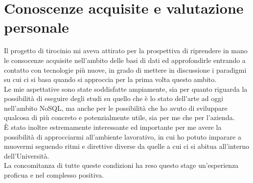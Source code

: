 \section{Conoscenze acquisite e valutazione personale}
Il progetto di tirocinio mi aveva attirato per la prospettiva di riprendere in mano le consocenze acquisite nell'ambito delle basi di dati ed approfondirle entrando a contatto con tecnologie più nuove, in grado di mettere in discussione i paradigmi su cui ci si basa quando si approccia per la prima volta questo ambito.\\

\noindent Le mie aspettative sono state soddisfatte ampiamente, sia per quanto riguarda la possibilità di eseguire degli studi su quello che è lo stato dell'arte ad oggi nell'ambito NoSQL, ma anche per le possibilità che ho avuto di sviluppare qualcosa di più concreto e potenzialmente utile, sia per me che per l'azienda.\\

\noindent È stato inoltre estremamente interessante ed importante per me avere la possibilità di approcciarmi all'ambiente lavorativo, in cui ho potuto imparare a muovermi seguendo ritmi e direttive diverse da quelle a cui ci si abitua all'interno dell'Università.\\

\noindent La concomitanza di tutte queste condizioni ha reso questo stage un'esperienza proficua e nel complesso positiva.\\